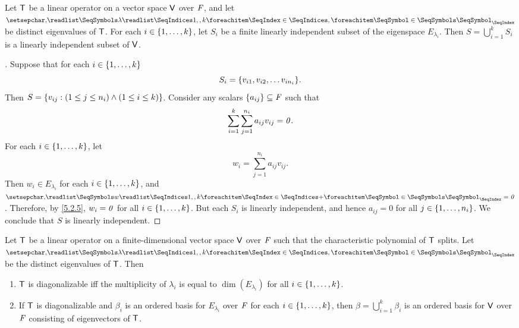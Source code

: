 \begin{thm}\label{5.8}
	Let \(\mathsf{T}\) be a linear operator on a vector space \(\mathsf{V}\) over \(\mathit{F}\), and let \(\seq{\lambda}{1,,k}\) be distinct eigenvalues of \(\mathsf{T}\).
	For each \(i \in \left\lbrace1, \dots, k\right\rbrace\), let \(S_i\) be a finite linearly independent subset of the eigenspace \(E_{\lambda_i}\).
	Then \(S = \bigcup_{i = 1}^k S_i\) is a linearly independent subset of \(\mathsf{V}\).
\end{thm}

\begin{proof}[]
	Suppose that for each \(i \in \left\lbrace1, \dots, k\right\rbrace\)
	\[
		S_i = \set{v_{i 1}, v_{i 2}, \dots v_{i n_i}}.
	\]
	Then \(S = \left\lbrace v_{i j} : (1 \leq j \leq n_i) \land (1 \leq i \leq k)\right\rbrace\).
	Consider any scalars \(\left\lbrace a_{i j}\right\rbrace \subseteq \mathit{F}\) such that
	\[
		\sum_{i = 1}^k \sum_{j = 1}^{n_i} a_{i j} v_{i j} = \mathit{0}.
	\]
	For each \(i \in \left\lbrace1, \dots, k\right\rbrace\), let
	\[
		w_i = \sum_{j = 1}^{n_i} a_{i j} v_{i j}.
	\]
	Then \(w_i \in E_{\lambda_i}\) for each \(i \in \left\lbrace1, \dots, k\right\rbrace\), and \(\seq[+]{w}{1,,k} = \zv\).
	Therefore, by \cref{5.2.5}, \(w_i = \mathit{0}\) for all \(i \in \left\lbrace1, \dots, k\right\rbrace\).
	But each \(S_i\) is linearly independent, and hence \(a_{i j} = 0\) for all \(j \in \left\lbrace1, \dots, n_i\right\rbrace\).
	We conclude that \(S\) is linearly independent.
\end{proof}

\begin{thm}\label{5.9}
	Let \(\mathsf{T}\) be a linear operator on a finite-dimensional vector space \(\mathsf{V}\) over \(\mathit{F}\) such that the characteristic polynomial of \(\mathsf{T}\) splits.
	Let \(\seq{\lambda}{1,,k}\) be the distinct eigenvalues of \(\mathsf{T}\).
	Then
	\begin{enumerate}
		\item \(\mathsf{T}\) is diagonalizable iff the multiplicity of \(\lambda_i\) is equal to \(\dim(E_{\lambda_i})\) for all \(i \in \left\lbrace1, \dots, k\right\rbrace\).
		\item If \(\mathsf{T}\) is diagonalizable and \(\beta_i\) is an ordered basis for \(E_{\lambda_i}\) over \(\mathit{F}\) for each \(i \in \left\lbrace1, \dots, k\right\rbrace\), then \(\beta = \bigcup_{i = 1}^k \beta_i\) is an ordered basis for \(\mathsf{V}\) over \(\mathit{F}\) consisting of eigenvectors of \(\mathsf{T}\).
	\end{enumerate}
\end{thm}

